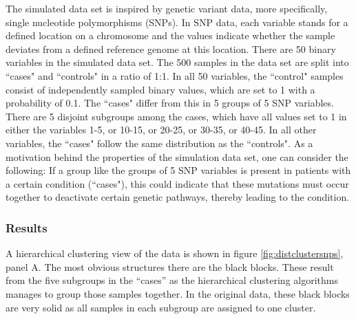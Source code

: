 \documentclass[12pt]{article}
\begin{document}
The simulated data set is inspired by genetic variant data, more specifically, single nucleotide polymorphisms (SNPs).
In SNP data, each variable stands for a defined location on a chromosome and the values indicate whether the sample deviates from a defined reference genome at this location.
There are 50 binary variables in the simulated data set.
The 500 samples in the data set are split into ``cases" and ``controls" in a ratio of 1:1.
In all 50 variables, the ``control" samples consist of independently sampled binary values, which are set to 1 with a probability of 0.1.
The ``cases" differ from this in 5 groups of 5 SNP variables.
There are 5 disjoint subgroups among the cases, which have all values set to 1 in either the variables 1-5, or 10-15, or 20-25, or 30-35, or 40-45.
In all other variables, the ``cases" follow the same distribution as the ``controls".
As a motivation behind the properties of the simulation data set, one can consider the following:
If a group like the groups of 5 SNP variables is present in patients with a certain condition (``cases"), this could indicate that these mutations must occur together to deactivate certain genetic pathways, thereby leading to the condition.


\subsubsection{Results}

A hierarchical clustering view of the data is shown in figure \ref{fig:distclustersnps}, panel A.
The most obvious structures there are the black blocks.
These result from the five subgroups in the ``cases'' as the hierarchical clustering algorithms manages to group those samples together.
In the original data, these black blocks are very solid as all samples in each subgroup are assigned to one cluster.
\end{document}
